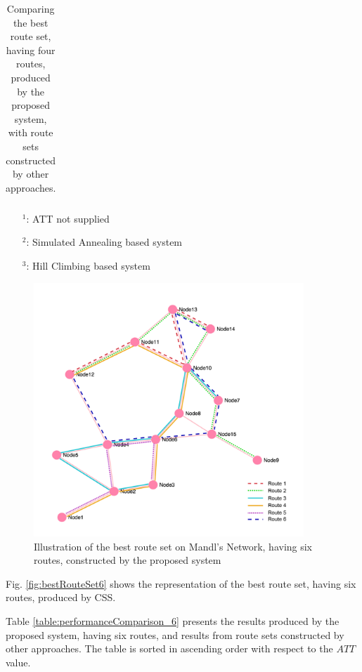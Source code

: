 \begin{table}[H]
\begin{tabular}{|l|l|l|l|l|l|}
    \hline
    \end{tabular}
    \caption {Comparing the best route set, having four routes, produced by the proposed system, with route sets constructed by other approaches.}
    \begin{itemize}[noitemsep]
    \item[$^1$:] ATT not supplied
    \item[$^2$:] Simulated Annealing based system
    \item[$^3$:] Hill Climbing based system
    \end{itemize}
    \label{table:performanceComparison_4}
\end{table}



\begin{figure}[H]
    \begin{center}
    \includegraphics[width=4in]{assets/mandlnetwork_6routes.png}
    \end{center}
    \caption{Illustration of the best route set on Mandl's Network, having six routes, constructed by the proposed system}
    \label{fig:bestRouteSet6} 
\end{figure}

Fig. \vref{fig:bestRouteSet6} shows the representation of the best route set, having six routes, produced by CSS.

Table \vref{table:performanceComparison_6} presents the results produced by the proposed system, having six routes, and results from route sets constructed by other approaches. The table is sorted in ascending order with respect to the $ATT$ value.

